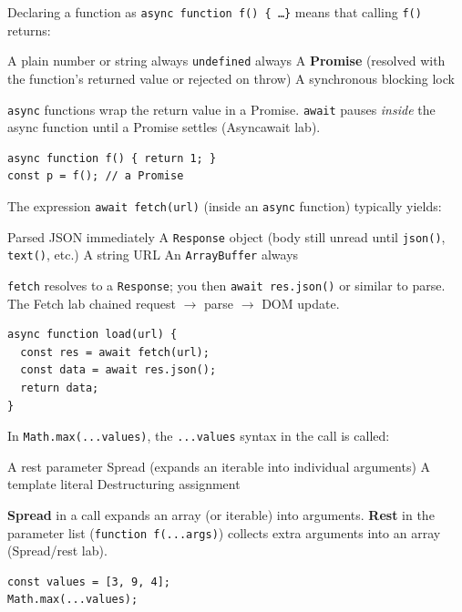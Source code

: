 \newpage

\question[4]
Declaring a function as \texttt{async function f() \{ \ldots \}} means that calling \texttt{f()} returns:
\begin{choices}
  \choice A plain number or string always
  \choice \texttt{undefined} always
  \CorrectChoice A \textbf{Promise} (resolved with the function's returned value or rejected on throw)
  \choice A synchronous blocking lock
\end{choices}
\begin{solution}
  \texttt{async} functions wrap the return value in a Promise. \texttt{await} pauses \emph{inside} the async function until a Promise settles (Asyncawait lab).
\begin{lstlisting}[style=jsexam]
async function f() { return 1; }
const p = f(); // a Promise
\end{lstlisting}
\end{solution}

\question[4]
The expression \texttt{await fetch(url)} (inside an \texttt{async} function) typically yields:
\begin{choices}
  \choice Parsed JSON immediately
  \CorrectChoice A \texttt{Response} object (body still unread until \texttt{json()}, \texttt{text()}, etc.)
  \choice A string URL
  \choice An \texttt{ArrayBuffer} always
\end{choices}
\begin{solution}
  \texttt{fetch} resolves to a \texttt{Response}; you then \texttt{await res.json()} or similar to parse. The Fetch lab chained request $\rightarrow$ parse $\rightarrow$ DOM update.
\begin{lstlisting}[style=jsexam]
async function load(url) {
  const res = await fetch(url);
  const data = await res.json();
  return data;
}
\end{lstlisting}
\end{solution}

\question[4]
In \texttt{Math.max(...values)}, the \texttt{...values} syntax in the call is called:
\begin{choices}
  \choice A rest parameter
  \CorrectChoice Spread (expands an iterable into individual arguments)
  \choice A template literal
  \choice Destructuring assignment
\end{choices}
\begin{solution}
  \textbf{Spread} in a call expands an array (or iterable) into arguments. \textbf{Rest} in the parameter list (\texttt{function f(...args)}) collects extra arguments into an array (Spread/rest lab).
\begin{lstlisting}[style=jsexam]
const values = [3, 9, 4];
Math.max(...values);
\end{lstlisting}
\end{solution}


